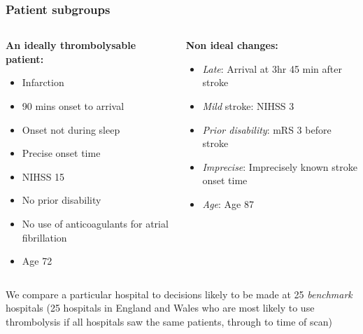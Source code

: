 \begin{frame}
\frametitle{Patient subgroups}

\begin{columns}[T]
\begin{column}{0.5\textwidth}
    \textbf{An ideally thrombolysable patient:}

    \begin{itemize}
        \item Infarction
        \item 90 mins onset to arrival
        \item Onset not during sleep
        \item Precise onset time
        \item NIHSS 15
        \item No prior disability
        \item No use of anticoagulants for atrial fibrillation
        \item Age 72
    \end{itemize}
\end{column}
\begin{column}{0.5\textwidth}

\textbf{Non ideal changes:}

    \begin{itemize}
        \item \textit{Late}: Arrival at 3hr 45 min after stroke
        \item \textit{Mild} stroke: NIHSS 3
        \item \textit{Prior disability}: mRS 3 before stroke
        \item \textit{Imprecise}: Imprecisely known stroke onset time
        \item \textit{Age}: Age 87

    \end{itemize}

\end{column}
\end{columns}

\vspace{3mm}
\footnotesize
We compare a particular hospital to decisions likely to be made at 25 \textit{benchmark} hospitals (25 hospitals in England and Wales who are most likely to use thrombolysis if all hospitals saw the same patients, through to time of scan)

\end{frame}